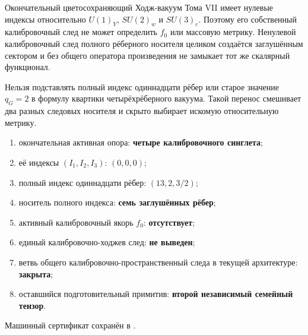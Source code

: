 \begin{theorem}
Окончательный цветосохраняющий Ходж-вакуум Тома VII имеет нулевые индексы
относительно $U(1)_Y$, $SU(2)_w$ и $SU(3)_c$. Поэтому его собственный
калибровочный след не может определить $f_0$ или массовую метрику.
Ненулевой калибровочный след полного рёберного носителя целиком создаётся
заглушённым сектором и без общего оператора произведения не замыкает тот же
скалярный функционал.
\end{theorem}

\begin{nogocriterion}
Нельзя подставлять полный индекс одиннадцати рёбер или старое значение
$q_G=2$ в формулу квартики четырёхрёберного вакуума. Такой перенос смешивает
два разных следовых носителя и скрыто выбирает искомую относительную метрику.
\end{nogocriterion}

\begin{protocol}
\begin{enumerate}
 \item окончательная активная опора: \textbf{четыре калибровочного синглета};
 \item её индексы $(I_1,I_2,I_3)$: \textbf{$(0,0,0)$};
 \item полный индекс одиннадцати рёбер: \textbf{$(13,2,3/2)$};
 \item носитель полного индекса: \textbf{семь заглушённых рёбер};
 \item активный калибровочный якорь $f_0$: \textbf{отсутствует};
 \item единый калибровочно-ходжев след: \textbf{не выведен};
 \item ветвь общего калибровочно-пространственный следа в текущей архитектуре:
 \textbf{закрыта};
 \item оставшийся подготовительный примитив: \textbf{второй независимый
 семейный тензор}.
\end{enumerate}
\end{protocol}

Машинный сертификат сохранён в
.